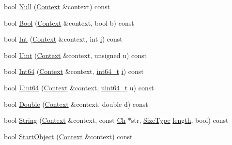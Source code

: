 \begin{DoxyCompactItemize}
\item 
bool \hyperlink{classinternal_1_1Schema_acd4fa9c33c9ef22a26ba160fdc1d78da}{Null} (\hyperlink{classinternal_1_1Schema_ac3f54abfefe300c5610c1205869cfd66}{Context} \&context) const
\item 
bool \hyperlink{classinternal_1_1Schema_ae7c03b431a9018ce0feb674f5cb45423}{Bool} (\hyperlink{classinternal_1_1Schema_ac3f54abfefe300c5610c1205869cfd66}{Context} \&context, bool b) const
\item 
bool \hyperlink{classinternal_1_1Schema_a1e3a87b01db90408be438dd4f5b8ee28}{Int} (\hyperlink{classinternal_1_1Schema_ac3f54abfefe300c5610c1205869cfd66}{Context} \&context, int \hyperlink{game__play__state_8cpp_acb559820d9ca11295b4500f179ef6392}{i}) const
\item 
bool \hyperlink{classinternal_1_1Schema_abd42af9c38c9a02cda760567751fb00f}{Uint} (\hyperlink{classinternal_1_1Schema_ac3f54abfefe300c5610c1205869cfd66}{Context} \&context, unsigned u) const
\item 
bool \hyperlink{classinternal_1_1Schema_a0190028fee83533e2b93f19ff5a99902}{Int64} (\hyperlink{classinternal_1_1Schema_ac3f54abfefe300c5610c1205869cfd66}{Context} \&context, \hyperlink{stdint_8h_a414156feea104f8f75b4ed9e3121b2f6}{int64\+\_\+t} \hyperlink{game__play__state_8cpp_acb559820d9ca11295b4500f179ef6392}{i}) const
\item 
bool \hyperlink{classinternal_1_1Schema_a1f80b1a9502b71530a98694e7b54987d}{Uint64} (\hyperlink{classinternal_1_1Schema_ac3f54abfefe300c5610c1205869cfd66}{Context} \&context, \hyperlink{stdint_8h_aec6fcb673ff035718c238c8c9d544c47}{uint64\+\_\+t} u) const
\item 
bool \hyperlink{classinternal_1_1Schema_a8336bcea8d0e802c4b070da18e04f1dd}{Double} (\hyperlink{classinternal_1_1Schema_ac3f54abfefe300c5610c1205869cfd66}{Context} \&context, double d) const
\item 
bool \hyperlink{classinternal_1_1Schema_a8e652cbc67fa34181c3fd813c38d5280}{String} (\hyperlink{classinternal_1_1Schema_ac3f54abfefe300c5610c1205869cfd66}{Context} \&context, const \hyperlink{classinternal_1_1Schema_a98043fca39adbf8b42e7472e3d80d6fa}{Ch} $\ast$str, \hyperlink{rapidjson_8h_a5ed6e6e67250fadbd041127e6386dcb5}{Size\+Type} \hyperlink{imgui__impl__opengl3__loader_8h_a011fc24f10426c01349e94a4edd4b0d5}{length}, bool) const
\item 
bool \hyperlink{classinternal_1_1Schema_a124c90c0b46d8a06ae5c0314467b6363}{Start\+Object} (\hyperlink{classinternal_1_1Schema_ac3f54abfefe300c5610c1205869cfd66}{Context} \&context) const

\end{DoxyCompactItemize}

